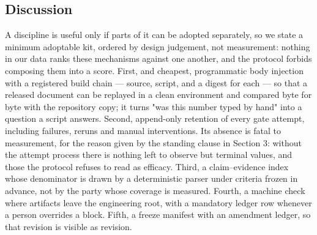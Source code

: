 \documentclass[
  english,
]{article}
\begin{document}
\subsection{Discussion}\label{discussion}

A discipline is useful only if parts of it can be adopted separately, so we state a minimum adoptable kit, ordered by design judgement, not measurement: nothing in our data ranks these mechanisms against one another, and the protocol forbids composing them into a score. First, and cheapest, programmatic body injection with a registered build chain --- source, script, and a digest for each --- so that a released document can be replayed in a clean environment and compared byte for byte with the repository copy; it turns "was this number typed by hand" into a question a script answers. Second, append-only retention of every gate attempt, including failures, reruns and manual interventions. Its absence is fatal to measurement, for the reason given by the standing clause in Section 3: without the attempt process there is nothing left to observe but terminal values, and those the protocol refuses to read as efficacy. Third, a claim--evidence index whose denominator is drawn by a deterministic parser under criteria frozen in advance, not by the party whose coverage is measured. Fourth, a machine check where artifacts leave the engineering root, with a mandatory ledger row whenever a person overrides a block. Fifth, a freeze manifest with an amendment ledger, so that revision is visible as revision.
\end{document}
